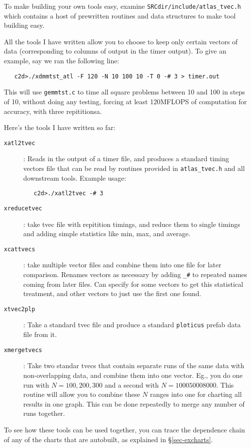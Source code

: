\documentclass[11pt]{article}
\begin{document}
To make building your own tools easy, examine 
{\tt SRCdir/include/atlas\_tvec.h}
which contains a host of prewritten routines and data structures to 
make tool building easy.

All the tools I have written allow you to choose to keep only certain
vectors of data (corresponding to columns of output in the timer output).
To give an example, say we ran the following line:
\begin{verbatim}
   c2d>./xdmmtst_atl -F 120 -N 10 100 10 -T 0 -# 3 > timer.out
\end{verbatim}

This will use {\tt gemmtst.c} to time all square problems between 10 and
100 in steps of 10, without doing any testing, forcing at least 120MFLOPS
of computation for accuracy, with three repititionsa.

Here's the tools I have written so far:
\begin{description}
\item [{\tt xatl2tvec}]: Reads in the output of a timer file, and produces
   a standard timing vectors file that can be read by routines provided
   in {\tt atlas\_tvec.h} and all downstream tools.  Example usage:
\begin{verbatim}
   c2d>./xatl2tvec -# 3
\end{verbatim}
\item [{\tt xreducetvec}]: take tvec file with repitition timings, and
      reduce them to single timings and adding simple statistics
      like min, max, and average.
\item [{\tt xcattvecs}]: take multiple vector files and combine them into
      one file for later comparison.  Renames vectors as necessary by
      adding \verb+_#+ to repeated names coming from later files.  Can
      specify for some vectors to get this statistical treatment, and
      other vectors to just use the first one found.
\item [{\tt xtvec2plp}]: Take a standard tvec file and produce a standard
      {\tt ploticus} prefab data file from it.
\item [{\tt xmergetvecs}]: Take two standar tvecs that contain separate runs
      of the same data with non-overlapping data, and combine them into
      one vector.  Eg., you do one run with $N=100,200, 300$ and a second
      with $N=1000 5000 8000$.  This routine will allow you to combine 
      these $N$ ranges into one for charting all results in one graph.
      This can be done repeatedly to merge any number of runs together.
\end{description}

To see how these tools can be used together, you can trace the dependence
chain of any of the charts that are autobuilt, as explained in
\S\ref{sec-excharts}.
\end{document}
